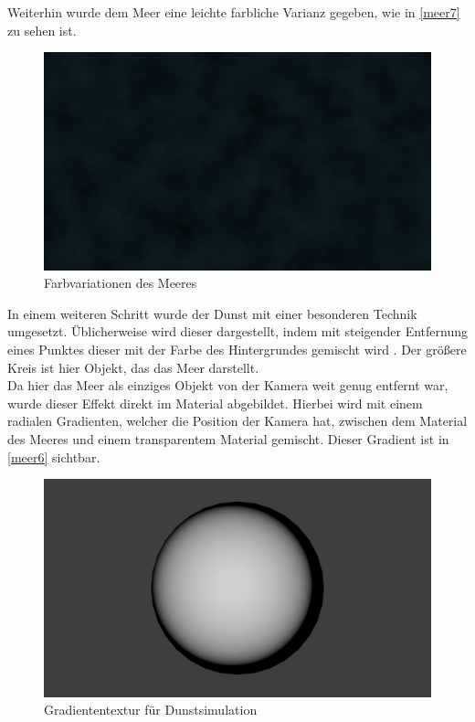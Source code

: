 Weiterhin wurde dem Meer eine leichte farbliche Varianz gegeben, wie in \autoref{meer7} zu sehen ist.

\begin{figure}[H]
\includegraphics[width=\textwidth]{gfx/prod/ocean/meer7.jpg}
\caption{Farbvariationen des Meeres}
\label{meer7}
\end{figure}

In einem weiteren Schritt wurde der Dunst mit einer besonderen Technik umgesetzt. Üblicherweise wird dieser dargestellt, indem mit steigender Entfernung eines Punktes dieser mit der Farbe des Hintergrundes gemischt wird . Der größere Kreis ist hier Objekt, das das Meer darstellt.\\
Da hier das Meer als einziges Objekt von der Kamera weit genug entfernt war, wurde dieser Effekt direkt im Material abgebildet. Hierbei wird mit einem radialen Gradienten, welcher die Position der Kamera hat, zwischen dem Material des Meeres und einem transparentem Material gemischt. Dieser Gradient ist in \autoref{meer6} sichtbar.

\begin{figure}[H]
\includegraphics[width=\textwidth]{gfx/prod/ocean/meer6.jpg}
\caption{Gradiententextur für Dunstsimulation}
\label{meer6}
\end{figure}

